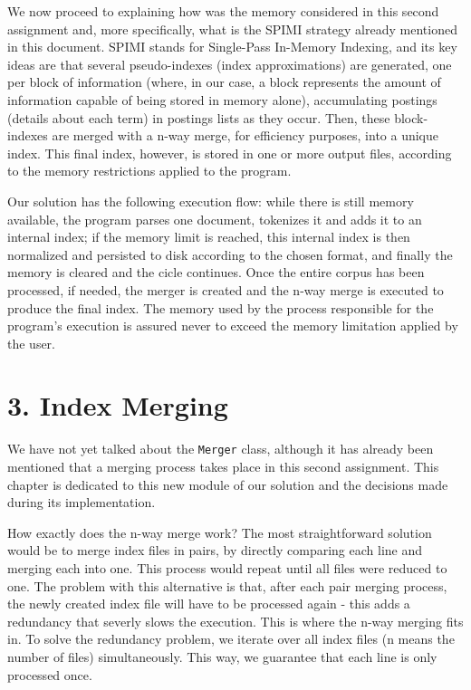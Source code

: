 \documentclass[12pt]{article}
\begin{document}
\newpage
We now proceed to explaining how was the memory considered in this second 
assignment and, more specifically, what is the SPIMI strategy already 
mentioned in this document.
SPIMI stands for Single-Pass In-Memory Indexing, and its key ideas are 
that several pseudo-indexes (index approximations) are generated, one per 
block of information (where, in our case, a block represents the amount 
of information capable of being stored in memory alone), accumulating 
postings (details about each term) in postings lists as they occur. 
Then, these block-indexes are merged with a n-way merge, for efficiency 
purposes, into a unique index.
This final index, however, is stored in one or more output files, 
according to the memory restrictions applied to the program.

Our solution has the following execution flow: while there is still memory 
available, the program parses one document, tokenizes it and adds it to an
internal index; if the memory limit is reached, this internal index is then 
normalized and persisted to disk according to the chosen format, and finally 
the memory is cleared and the cicle continues.
Once the entire corpus has been processed, if needed, the merger is created 
and the n-way merge is executed to produce the final index. 
The memory used by the process responsible for the program's execution is 
assured never to exceed the memory limitation applied by the user.

\newpage
\section*{3. Index Merging}

We have not yet talked about the \texttt{Merger} class, although it has 
already been mentioned that a merging process takes place in this second 
assignment.
This chapter is dedicated to this new module of our solution and the 
decisions made during its implementation.

How exactly does the n-way merge work? 
The most straightforward solution would be to merge index files in pairs, 
by directly comparing each line and merging each into one. This process 
would repeat until all files were reduced to one.
The problem with this alternative is that, after each pair merging process, 
the newly created index file will have to be processed again - this adds a 
redundancy that severly slows the execution.
This is where the n-way merging fits in.
To solve the redundancy problem, we iterate over all index files (n means 
the number of files) simultaneously. 
This way, we guarantee that each line is only processed once.
\end{document}
